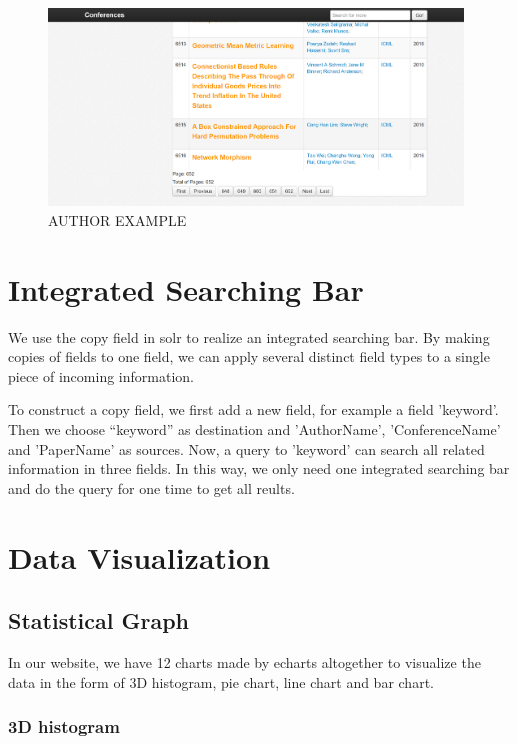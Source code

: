 \documentclass{book}
\begin{document}
\begin{figure}[b]
\centering
\includegraphics[width=11.0cm]{img/dsw_con.png}
\caption{AUTHOR EXAMPLE}
\label{pict:dsw2}
\end{figure}




\chapter {Integrated Searching Bar}

We use the copy field in solr to realize an integrated searching bar. By making copies of fields to one field, we can apply several distinct field types to a single piece of incoming information.

To construct a copy field, we first add a new field, for example a field 'keyword'. Then we choose ``keyword'' as destination and 'AuthorName', 'ConferenceName' and 'PaperName' as sources. Now, a query to 'keyword' can search all related information in three fields. In this way, we only need one integrated searching bar and do the query for one time to get all reults.


\chapter {Data Visualization}


\section {Statistical Graph}
In our website, we have 12 charts made by echarts altogether to visualize the data in the form of 3D histogram, pie chart, line chart and bar chart.

\subsection {3D histogram}
\end{document}
